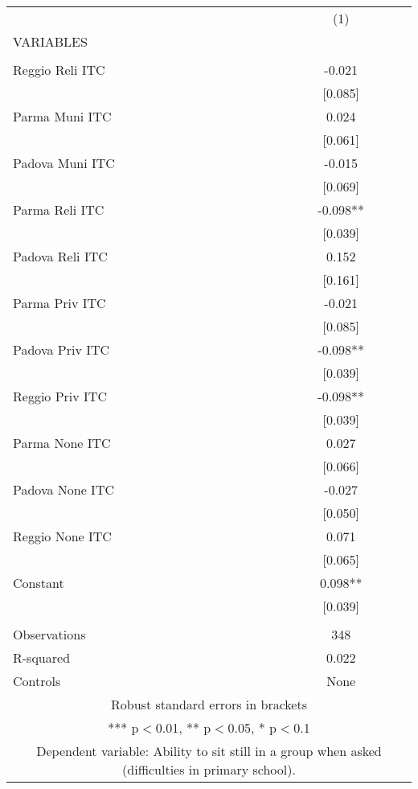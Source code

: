 \begin{tabular}{lc} \hline
 & (1) \\
VARIABLES &  \\ \hline
 &  \\
Reggio Reli ITC & -0.021 \\
 & [0.085] \\
Parma Muni ITC & 0.024 \\
 & [0.061] \\
Padova Muni ITC & -0.015 \\
 & [0.069] \\
Parma Reli ITC & -0.098** \\
 & [0.039] \\
Padova Reli ITC & 0.152 \\
 & [0.161] \\
Parma Priv ITC & -0.021 \\
 & [0.085] \\
Padova Priv ITC & -0.098** \\
 & [0.039] \\
Reggio Priv ITC & -0.098** \\
 & [0.039] \\
Parma None ITC & 0.027 \\
 & [0.066] \\
Padova None ITC & -0.027 \\
 & [0.050] \\
Reggio None ITC & 0.071 \\
 & [0.065] \\
Constant & 0.098** \\
 & [0.039] \\
 &  \\
Observations & 348 \\
R-squared & 0.022 \\
 Controls & None \\ \hline
\multicolumn{2}{c}{ Robust standard errors in brackets} \\
\multicolumn{2}{c}{ *** p$<$0.01, ** p$<$0.05, * p$<$0.1} \\
\multicolumn{2}{c}{ Dependent variable: Ability to sit still in a group when asked (difficulties in primary school).} \\
\end{tabular}
